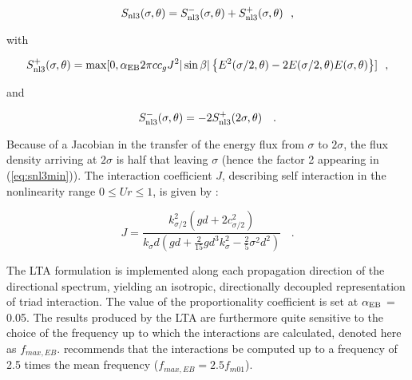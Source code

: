 \begin{equation}
   S_{\rm nl3} (\sigma,\theta) = S^-_{\rm nl3} (\sigma,\theta) + S^+_{\rm nl3}
   (\sigma,\theta) \:\:\: ,
   \label{eq:snl3}
\end{equation}

\noindent
with

\begin{equation}
  S^+_{\rm nl3} (\sigma,\theta) = \max [0,\alpha_{\rm EB} 2 \pi c c_g J^2 |\sin\beta| \left \{ E^2(\sigma/2,\theta) - 
  2 E(\sigma/2,\theta) E(\sigma,\theta) \right \}] \:\:\: ,
  \label{eq:snl3plu}
\end{equation}

\noindent
and

\begin{equation}
  S^-_{\rm nl3} (\sigma,\theta) = -2 S^+_{\rm nl3} (2\sigma,\theta)\ \:\:\: .
  \label{eq:snl3min}
\end{equation}

\noindent
Because of a Jacobian in the transfer of the energy flux from $\sigma$ to $2
\sigma$, the flux density arriving at $2 \sigma$ is half that leaving $\sigma$
(hence the factor 2 appearing in (\ref{eq:snl3min})). The interaction
coefficient $J$, describing self interaction in the nonlinearity range $0 \leq
Ur \leq 1$, is given by \citep{art:MS93}:

\begin{equation}
   J = \frac{k^2_{\sigma/2} (gd + 2 c^2_{\sigma/2})}
      {k_\sigma d (gd + \frac{2}{15} gd^3 k^2_\sigma - \frac{2}{5} \sigma^2
        d^2)}\ \:\:\:  .
   \label{eq:intcoef}
\end{equation}

\noindent
The LTA formulation is implemented along each propagation direction of 
the directional spectrum, yielding an isotropic, directionally decoupled 
representation of triad interaction. The value of the proportionality 
coefficient is set at $\alpha_{\rm EB}$ = 0.05. The results produced by 
the LTA are furthermore quite sensitive to the choice of the frequency up 
to which the interactions are calculated, denoted here as $f_{max,EB}$. 
\citep{rep:Eld95} recommends that the interactions be computed 
up to a frequency of 2.5 times the mean frequency ($f_{max,EB} = 
2.5 f_{m01}$).
